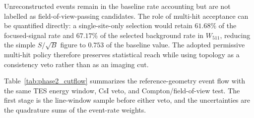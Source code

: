 \documentclass[11pt]{article}
\newcommand{\wii}{W_{511}}
\begin{document}
Unreconstructed events remain in the baseline rate accounting but are not
labelled as field-of-view-passing candidates. The role of multi-hit acceptance
can be quantified directly: a single-site-only selection would retain
$61.68\%$ of the focused-signal rate and $67.17\%$ of the selected background
rate in $\wii$, reducing the simple $S/\sqrt{B}$ figure to $0.753$ of the
baseline value. The adopted permissive multi-hit policy therefore preserves
statistical reach while using topology as a consistency veto rather than as an
imaging cut.

Table~\ref{tab:phase2_cutflow} summarizes the reference-geometry event flow with
the same TES energy window, CsI veto, and Compton/field-of-view test. The first
stage is the line-window sample before either veto, and the uncertainties are the
quadrature sums of the event-rate weights.
\end{document}
